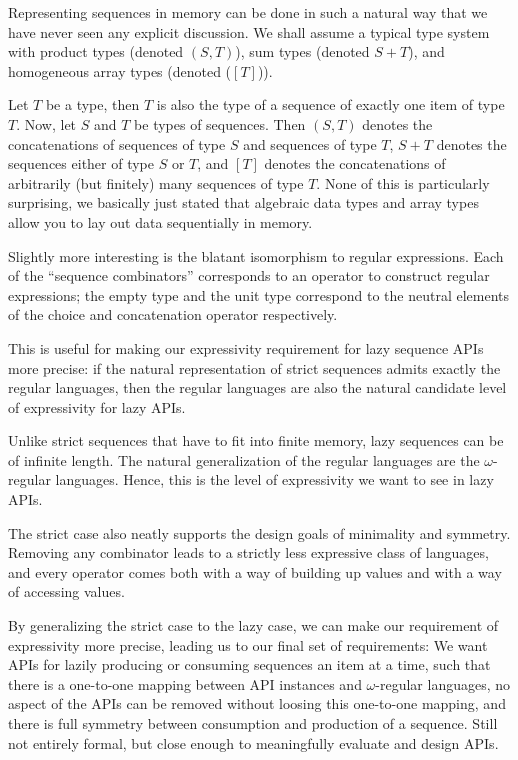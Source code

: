 \documentclass[sigplan,screen,10pt,anonymous,review]{acmart}
\begin{document}
Representing sequences in memory can be done in such a natural way that we have never seen any explicit discussion. We shall assume a typical type system with product types (denoted $(S, T)$), sum types (denoted $S + T$), and homogeneous array types (denoted ($[T]$)).

Let $T$ be a type, then $T$ is also the type of a sequence of exactly one item of type $T$. Now, let $S$ and $T$ be types of sequences. Then $(S, T)$ denotes the concatenations of sequences of type $S$ and sequences of type $T$, $S + T$ denotes the sequences either of type $S$ or $T$, and $[T]$ denotes the concatenations of arbitrarily (but finitely) many sequences of type $T$. None of this is particularly surprising, we basically just stated that algebraic data types and array types allow you to lay out data sequentially in memory.

Slightly more interesting is the blatant isomorphism to regular expressions. Each of the ``sequence combinators'' corresponds to an operator to construct regular expressions; the empty type and the unit type correspond to the neutral elements of the choice and concatenation operator respectively.

This is useful for making our expressivity requirement for lazy sequence APIs more precise: if the natural representation of strict sequences admits exactly the regular languages, then the regular languages are also the natural candidate level of expressivity for lazy APIs.

Unlike strict sequences that have to fit into finite memory, lazy sequences can be of infinite length. The natural generalization of the regular languages are the $\omega$-regular languages. Hence, this is the level of expressivity we want to see in lazy APIs.

The strict case also neatly supports the design goals of minimality and symmetry. Removing any combinator leads to a strictly less expressive class of languages, and every operator comes both with a way of building up values and with a way of accessing values.

By generalizing the strict case to the lazy case, we can make our requirement of expressivity more precise, leading us to our final set of requirements: We want APIs for lazily producing or consuming sequences an item at a time, such that there is a one-to-one mapping between API instances and $\omega$-regular languages, no aspect of the APIs can be removed without loosing this one-to-one mapping, and there is full symmetry between consumption and production of a sequence. Still not entirely formal, but close enough to meaningfully evaluate and design APIs.
\end{document}
